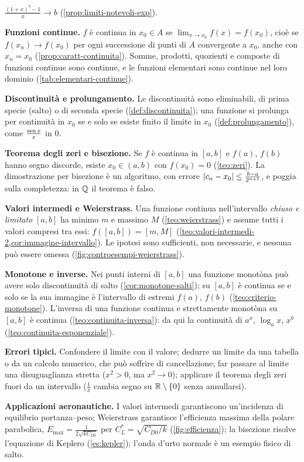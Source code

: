 \begin{puntichiave}
$\frac{(1+x)^{b}-1}{x}\to b$ (\cref{prop:limiti-notevoli-exp}).
\item \textbf{Funzioni continue.} $f$ è continua in $x_{0}\in A$ se
$\lim_{x\to x_{0}}f(x)=f(x_{0})$, cioè se $f(x_{n})\to f(x_{0})$ per ogni successione di
punti di $A$ convergente a $x_{0}$, anche con $x_{n}=x_{0}$
(\cref{prop:caratt-continuita}). Somme, prodotti, quozienti e composte di funzioni
continue sono continue, e le funzioni elementari sono continue nel loro dominio
(\cref{tab:elementari-continue}).
\item \textbf{Discontinuità e prolungamento.} Le discontinuità sono eliminabili, di
prima specie (salto) o di seconda specie (\cref{def:discontinuita}); una funzione si
prolunga per continuità in $x_{0}$ se e solo se esiste finito il limite in $x_{0}$
(\cref{def:prolungamento}), come $\frac{\operatorname{sen} x}{x}$ in $0$.
\item \textbf{Teorema degli zeri e bisezione.} Se $f$ è continua in $[a,b]$ e $f(a)$,
$f(b)$ hanno segno discorde, esiste $x_{0}\in(a,b)$ con $f(x_{0})=0$ (\cref{teo:zeri}).
La dimostrazione per bisezione è un algoritmo, con errore
$\lvert c_{n}-x_{0}\rvert\le\frac{b-a}{2^{n+1}}$, e poggia sulla completezza: in $\mathbb{Q}$ il
teorema è falso.
\item \textbf{Valori intermedi e Weierstrass.} Una funzione continua nell'intervallo
\emph{chiuso e limitato} $[a,b]$ ha minimo $m$ e massimo $M$ (\cref{teo:weierstrass}) e
assume tutti i valori compresi tra essi: $f([a,b])=[m,M]$
(\cref{teo:valori-intermedi-2,cor:immagine-intervallo}). Le ipotesi sono sufficienti, non
necessarie, e nessuna può essere omessa (\cref{fig:controesempi-weierstrass}).
\item \textbf{Monotone e inverse.} Nei punti interni di $[a,b]$ una funzione monotòna
può avere solo discontinuità di salto (\cref{cor:monotone-salti}); su $[a,b]$ è continua se e solo se la sua immagine è
l'intervallo di estremi $f(a)$, $f(b)$ (\cref{teo:criterio-monotone}). L'inversa di una
funzione continua e strettamente monotòna su $[a,b]$ è continua (\cref{teo:continuita-inversa}):
da qui la continuità di $a^{x}$, $\log_{a}x$, $x^{b}$ (\cref{teo:continuita-esponenziale}).
\item \textbf{Errori tipici.} Confondere il limite con il valore; dedurre un limite da
una tabella o da un calcolo numerico, che può soffrire di cancellazione; far passare al
limite una disuguaglianza stretta ($x^{2}>0$, ma $x^{2}\to0$); applicare il teorema
degli zeri fuori da un intervallo ($\frac1x$ cambia segno su $\mathbb{R}\setminus\{0\}$ senza
annullarsi).
\item \textbf{Applicazioni aeronautiche.} I valori intermedi garantiscono un'incidenza
di equilibrio portanza--peso; Weierstrass garantisce l'efficienza massima della polare
parabolica, $E_{\max}=\frac1{2\sqrt{kC_{D0}}}$ per $C_{L}^{*}=\sqrt{C_{D0}/k}$
(\cref{fig:efficienza}); la bisezione risolve l'equazione di Keplero
(\cref{es:kepler}); l'onda d'urto normale è un esempio fisico di salto.
\end{puntichiave}

